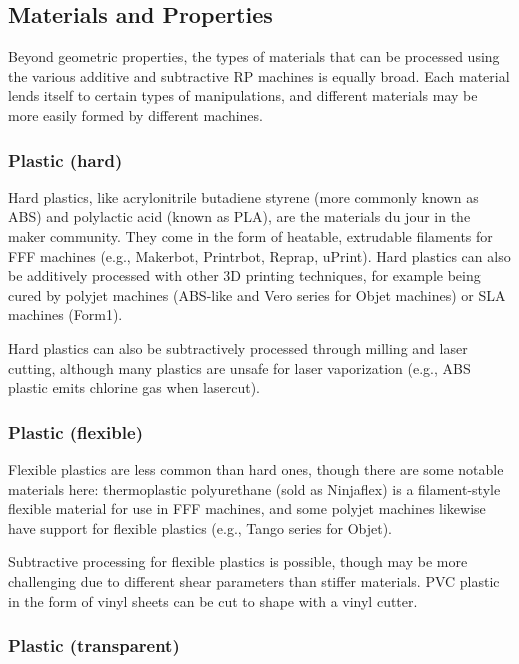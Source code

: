 \subsection{Materials and Properties}

Beyond geometric properties, the types of materials that can be processed using the various additive and subtractive RP machines is equally broad. Each material lends itself to certain types of manipulations, and different materials may be more easily formed by different machines.

\subsubsection{Plastic (hard)}

Hard plastics, like acrylonitrile butadiene styrene (more commonly known as ABS) and polylactic acid (known as PLA), are the materials du jour in the maker community. They come in the form of heatable, extrudable filaments for FFF machines (e.g., Makerbot, Printrbot, Reprap, uPrint). Hard plastics can also be additively processed with other 3D printing techniques, for example being cured by polyjet machines (ABS-like and Vero series for Objet machines) or SLA machines (Form1).

Hard plastics can also be subtractively processed through milling and laser cutting, although many plastics are unsafe for laser vaporization (e.g., ABS plastic emits chlorine gas when lasercut).

\subsubsection{Plastic (flexible)}

Flexible plastics are less common than hard ones, though there are some notable materials here: thermoplastic polyurethane (sold as Ninjaflex) is a filament-style flexible material for use in FFF machines, and some polyjet machines likewise have support for flexible plastics (e.g., Tango series for Objet).

Subtractive processing for flexible plastics is possible, though may be more challenging due to different shear parameters than stiffer materials. PVC plastic in the form of vinyl sheets can be cut to shape with a vinyl cutter.

\subsubsection{Plastic (transparent)}

